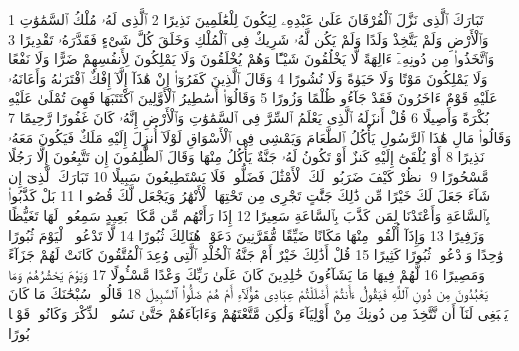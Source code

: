 {\tiny\colorbox{cl_aya}{1}} تَبَارَكَ ٱلَّذِى نَزَّلَ ٱلْفُرْقَانَ عَلَىٰ عَبْدِهِۦ لِيَكُونَ لِلْعَٰلَمِينَ نَذِيرًا
{\tiny\colorbox{cl_aya}{2}} ٱلَّذِى لَهُۥ مُلْكُ ٱلسَّمَٰوَٰتِ وَٱلْأَرْضِ وَلَمْ يَتَّخِذْ وَلَدًا وَلَمْ يَكُن لَّهُۥ شَرِيكٌ فِى ٱلْمُلْكِ وَخَلَقَ كُلَّ شَىْءٍ فَقَدَّرَهُۥ تَقْدِيرًا
{\tiny\colorbox{cl_aya}{3}} وَٱتَّخَذُوا۟ مِن دُونِهِۦٓ ءَالِهَةً لَّا يَخْلُقُونَ شَيْـًٔا وَهُمْ يُخْلَقُونَ وَلَا يَمْلِكُونَ لِأَنفُسِهِمْ ضَرًّا وَلَا نَفْعًا وَلَا يَمْلِكُونَ مَوْتًا وَلَا حَيَوٰةً وَلَا نُشُورًا
{\tiny\colorbox{cl_aya}{4}} وَقَالَ ٱلَّذِينَ كَفَرُوٓا۟ إِنْ هَٰذَآ إِلَّآ إِفْكٌ ٱفْتَرَىٰهُ وَأَعَانَهُۥ عَلَيْهِ قَوْمٌ ءَاخَرُونَ فَقَدْ جَآءُو ظُلْمًا وَزُورًا
{\tiny\colorbox{cl_aya}{5}} وَقَالُوٓا۟ أَسَٰطِيرُ ٱلْأَوَّلِينَ ٱكْتَتَبَهَا فَهِىَ تُمْلَىٰ عَلَيْهِ بُكْرَةً وَأَصِيلًا
{\tiny\colorbox{cl_aya}{6}} قُلْ أَنزَلَهُ ٱلَّذِى يَعْلَمُ ٱلسِّرَّ فِى ٱلسَّمَٰوَٰتِ وَٱلْأَرْضِ إِنَّهُۥ كَانَ غَفُورًا رَّحِيمًا
{\tiny\colorbox{cl_aya}{7}} وَقَالُوا۟ مَالِ هَٰذَا ٱلرَّسُولِ يَأْكُلُ ٱلطَّعَامَ وَيَمْشِى فِى ٱلْأَسْوَاقِ لَوْلَآ أُنزِلَ إِلَيْهِ مَلَكٌ فَيَكُونَ مَعَهُۥ نَذِيرًا
{\tiny\colorbox{cl_aya}{8}} أَوْ يُلْقَىٰٓ إِلَيْهِ كَنزٌ أَوْ تَكُونُ لَهُۥ جَنَّةٌ يَأْكُلُ مِنْهَا وَقَالَ ٱلظَّٰلِمُونَ إِن تَتَّبِعُونَ إِلَّا رَجُلًا مَّسْحُورًا
{\tiny\colorbox{cl_aya}{9}} ٱنظُرْ كَيْفَ ضَرَبُوا۟ لَكَ ٱلْأَمْثَٰلَ فَضَلُّوا۟ فَلَا يَسْتَطِيعُونَ سَبِيلًا
{\tiny\colorbox{cl_aya}{10}} تَبَارَكَ ٱلَّذِىٓ إِن شَآءَ جَعَلَ لَكَ خَيْرًا مِّن ذَٰلِكَ جَنَّٰتٍ تَجْرِى مِن تَحْتِهَا ٱلْأَنْهَٰرُ وَيَجْعَل لَّكَ قُصُورًۢا
{\tiny\colorbox{cl_aya}{11}} بَلْ كَذَّبُوا۟ بِٱلسَّاعَةِ وَأَعْتَدْنَا لِمَن كَذَّبَ بِٱلسَّاعَةِ سَعِيرًا
{\tiny\colorbox{cl_aya}{12}} إِذَا رَأَتْهُم مِّن مَّكَانٍۭ بَعِيدٍ سَمِعُوا۟ لَهَا تَغَيُّظًا وَزَفِيرًا
{\tiny\colorbox{cl_aya}{13}} وَإِذَآ أُلْقُوا۟ مِنْهَا مَكَانًا ضَيِّقًا مُّقَرَّنِينَ دَعَوْا۟ هُنَالِكَ ثُبُورًا
{\tiny\colorbox{cl_aya}{14}} لَّا تَدْعُوا۟ ٱلْيَوْمَ ثُبُورًا وَٰحِدًا وَٱدْعُوا۟ ثُبُورًا كَثِيرًا
{\tiny\colorbox{cl_aya}{15}} قُلْ أَذَٰلِكَ خَيْرٌ أَمْ جَنَّةُ ٱلْخُلْدِ ٱلَّتِى وُعِدَ ٱلْمُتَّقُونَ كَانَتْ لَهُمْ جَزَآءً وَمَصِيرًا
{\tiny\colorbox{cl_aya}{16}} لَّهُمْ فِيهَا مَا يَشَآءُونَ خَٰلِدِينَ كَانَ عَلَىٰ رَبِّكَ وَعْدًا مَّسْـُٔولًا
{\tiny\colorbox{cl_aya}{17}} وَيَوْمَ يَحْشُرُهُمْ وَمَا يَعْبُدُونَ مِن دُونِ ٱللَّهِ فَيَقُولُ ءَأَنتُمْ أَضْلَلْتُمْ عِبَادِى هَٰٓؤُلَآءِ أَمْ هُمْ ضَلُّوا۟ ٱلسَّبِيلَ
{\tiny\colorbox{cl_aya}{18}} قَالُوا۟ سُبْحَٰنَكَ مَا كَانَ يَنۢبَغِى لَنَآ أَن نَّتَّخِذَ مِن دُونِكَ مِنْ أَوْلِيَآءَ وَلَٰكِن مَّتَّعْتَهُمْ وَءَابَآءَهُمْ حَتَّىٰ نَسُوا۟ ٱلذِّكْرَ وَكَانُوا۟ قَوْمًۢا بُورًا
